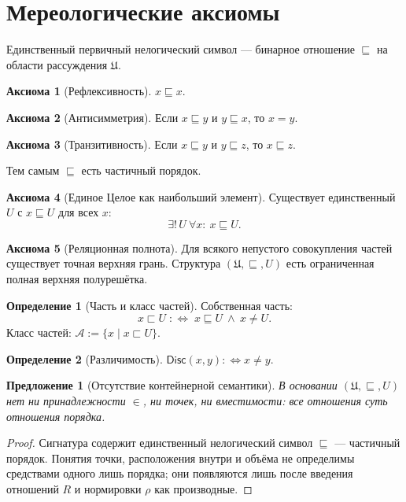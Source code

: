 \documentclass[12pt,a4paper,oneside]{book}
\theoremstyle{definition}
\newtheorem{axiom}{Аксиома}[chapter]
\newtheorem{definition}{Определение}[chapter]
\theoremstyle{plain}
\newtheorem{proposition}{Предложение}[chapter]
\theoremstyle{remark}
\newcommand{\Whole}{U}
\newcommand{\Parts}{\mathcal A}
\newcommand{\Rel}{R}
\newcommand{\PartOf}{\sqsubseteq}
\newcommand{\PropPart}{\sqsubset}
\newcommand{\norm}{\rho}
\newcommand{\Disc}{\mathsf{Disc}}
\begin{document}
\section{Мереологические аксиомы}

Единственный первичный нелогический символ --- бинарное отношение $\PartOf$ на области
рассуждения $\mathfrak U$.

\begin{axiom}[Рефлексивность]
$x\PartOf x$.
\end{axiom}

\begin{axiom}[Антисимметрия]
Если $x\PartOf y$ и $y\PartOf x$, то $x=y$.
\end{axiom}

\begin{axiom}[Транзитивность]
Если $x\PartOf y$ и $y\PartOf z$, то $x\PartOf z$.
\end{axiom}

Тем самым $\PartOf$ есть частичный порядок.

\begin{axiom}[Единое Целое как наибольший элемент]
Существует единственный $\Whole$ с $x\PartOf\Whole$ для всех $x$:
\[
\exists!\,\Whole\ \forall x:\ x\PartOf\Whole.
\]
\end{axiom}

\begin{axiom}[Реляционная полнота]
Для всякого непустого совокупления частей существует точная верхняя грань. Структура
$(\mathfrak U,\PartOf,\Whole)$ есть ограниченная полная верхняя полурешётка.
\end{axiom}

\begin{definition}[Часть и класс частей]
Собственная часть:
\[
x\PropPart\Whole\;:\Longleftrightarrow\;x\PartOf\Whole\ \wedge\ x\neq\Whole.
\]
Класс частей: $\Parts:=\{x\mid x\PropPart\Whole\}$.
\end{definition}

\begin{definition}[Различимость]
$\Disc(x,y):\Longleftrightarrow x\neq y$.
\end{definition}

\begin{proposition}[Отсутствие контейнерной семантики]
В основании $(\mathfrak U,\PartOf,\Whole)$ нет ни принадлежности $\in$, ни точек, ни
вместимости: все отношения суть отношения порядка.
\end{proposition}

\begin{proof}
Сигнатура содержит единственный нелогический символ $\PartOf$ --- частичный порядок.
Понятия точки, расположения внутри и объёма не определимы средствами одного лишь
порядка; они появляются лишь после введения отношений $\Rel$ и нормировки $\norm$ как
производные.
\end{proof}
\end{document}
